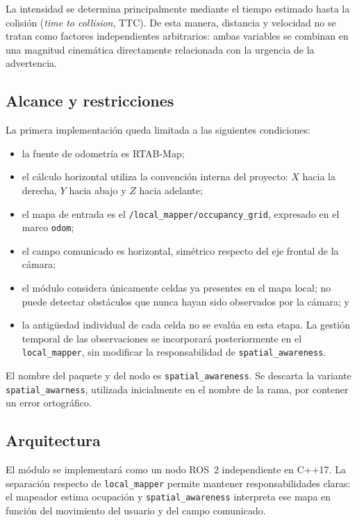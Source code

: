 La intensidad se determina principalmente mediante el tiempo estimado hasta
la colisión (\emph{time to collision}, TTC). De esta manera, distancia y
velocidad no se tratan como factores independientes arbitrarios: ambas
variables se combinan en una magnitud cinemática directamente relacionada con
la urgencia de la advertencia.

\subsection{Alcance y restricciones}
\label{subsec:sa-scope}

La primera implementación queda limitada a las siguientes condiciones:
%
\begin{itemize}
  \item la fuente de odometría es RTAB-Map;
  \item el cálculo horizontal utiliza la convención interna del proyecto:
    $X$ hacia la derecha, $Y$ hacia abajo y $Z$ hacia adelante;
  \item el mapa de entrada es el
    \texttt{/local\_mapper/occupancy\_grid}, expresado en el marco
    \texttt{odom};
  \item el campo comunicado es horizontal, simétrico respecto del eje frontal
    de la cámara;
  \item el módulo considera únicamente celdas ya presentes en el mapa local;
    no puede detectar obstáculos que nunca hayan sido observados por la
    cámara; y
  \item la antigüedad individual de cada celda no se evalúa en esta etapa. La
    gestión temporal de las observaciones se incorporará posteriormente en el
    \texttt{local\_mapper}, sin modificar la responsabilidad de
    \texttt{spatial\_awareness}.
\end{itemize}

El nombre del paquete y del nodo es \texttt{spatial\_awareness}. Se descarta
la variante \texttt{spatial\_awarness}, utilizada inicialmente en el nombre de
la rama, por contener un error ortográfico.

\subsection{Arquitectura}
\label{subsec:sa-architecture}

El módulo se implementará como un nodo ROS~2 independiente en C++17. La
separación respecto de \texttt{local\_mapper} permite mantener responsabilidades
claras: el mapeador estima ocupación y \texttt{spatial\_awareness} interpreta
ese mapa en función del movimiento del usuario y del campo comunicado.

